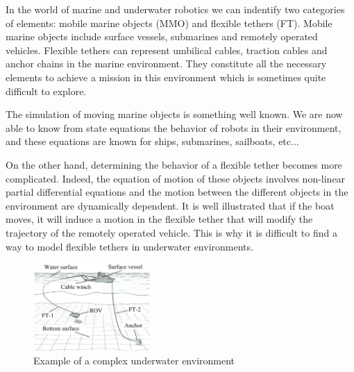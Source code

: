 In the world of marine and underwater robotics we can indentify two categories of elements: mobile marine objects (MMO) and flexible tethers (FT). Mobile marine objects include surface vessels, submarines and remotely operated vehicles. Flexible tethers can represent umbilical cables, traction cables and anchor chains in the marine environment. They constitute all the necessary elements to achieve a mission in this environment which is sometimes quite difficult to explore.

The simulation of moving marine objects is something well known. We are now able to know from state equations the behavior of robots in their environment, and these equations are known for ships, submarines, sailboats, etc...

On the other hand, determining the behavior of a flexible tether becomes more complicated. Indeed, the equation of motion of these objects involves non-linear partial differential equations and the motion between the different objects in the environment are dynamically dependent. It is well illustrated that if the boat moves, it will induce a motion in the flexible tether that will modify the trajectory of the remotely operated vehicle. This is why it is difficult to find a way to model flexible tethers in underwater environments.

\begin{figure}
	\centering
	\includegraphics[width=0.4\textwidth]{imgs/underwater_environment.png}
	\caption{Example of a complex underwater environment }
	\label{fig:underwater_environment}
\end{figure}